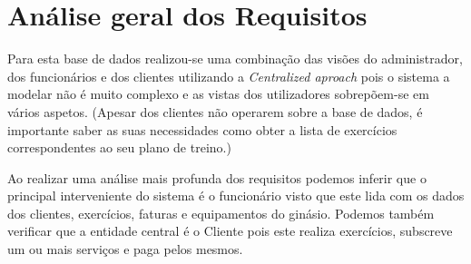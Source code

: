 \section{Análise geral dos Requisitos}

Para esta base de dados realizou-se uma combinação das visões do administrador, dos funcionários e dos clientes utilizando a  \textit{Centralized aproach} pois o sistema a modelar não é muito complexo e as vistas dos utilizadores sobrepõem-se em vários aspetos. (Apesar dos clientes não operarem sobre a base de dados, é importante saber as suas necessidades como obter a lista de exercícios correspondentes ao seu plano de treino.)
\newline
\par
Ao realizar uma análise mais profunda dos requisitos podemos inferir que o principal interveniente do sistema é o funcionário visto que este lida com os dados dos clientes, exercícios, faturas e equipamentos do ginásio.
Podemos também verificar que a entidade central é o Cliente pois este realiza exercícios, subscreve um ou mais serviços e paga pelos mesmos.

